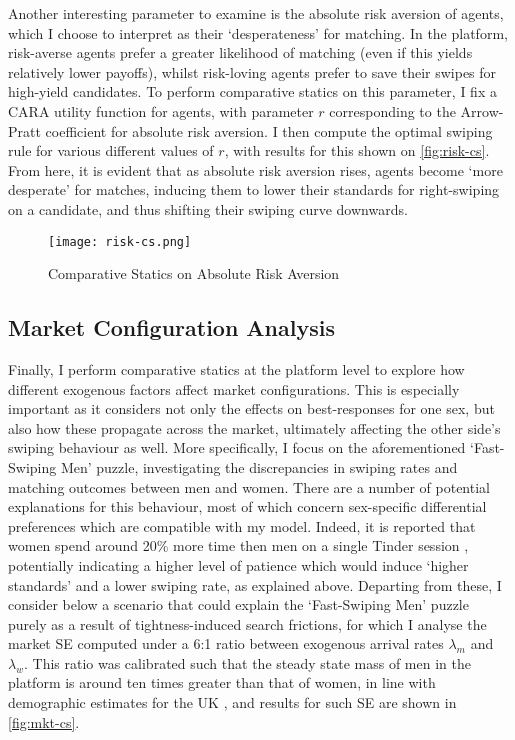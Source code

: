 Another interesting parameter to examine is the absolute risk aversion of agents, which I choose to interpret as their `desperateness' for matching.
In the platform, risk-averse agents prefer a greater likelihood of matching (even if this yields relatively lower payoffs), whilst risk-loving agents prefer to save their swipes for high-yield candidates. 
To perform comparative statics on this parameter, I fix a CARA utility function for agents, with parameter $r$ corresponding to the Arrow-Pratt coefficient for absolute risk aversion. 
I then compute the optimal swiping rule for various different values of $r$, with results for this shown on \autoref{fig:risk-cs}.
From here, it is evident that as absolute risk aversion rises, agents become `more desperate' for matches, inducing them to lower their standards for right-swiping on a candidate, and thus shifting their swiping curve downwards.

\begin{figure}[ht]
    \centering
    \caption{Comparative Statics on Absolute Risk Aversion}
    \texttt{[image: risk-cs.png]}
    \label{fig:risk-cs} 
\end{figure}

\subsection{Market Configuration Analysis}\label{sec:section3.3} 
Finally, I perform comparative statics at the platform level to explore how different exogenous factors affect market configurations. 
This is especially important as it considers not only the effects on best-responses for one sex, but also how these propagate across the market, ultimately affecting the other side's swiping behaviour as well. 
More specifically, I focus on the aforementioned `Fast-Swiping Men' puzzle, investigating the discrepancies in swiping rates and matching outcomes between men and women. 
There are a number of potential explanations for this behaviour, most of which concern sex-specific differential preferences which are compatible with my model. 
Indeed, it is reported that women spend around 20\% more time then men on a single Tinder session \citep{web:nytimes_patience}, potentially indicating a higher level of patience which would induce `higher standards' and a lower swiping rate, as explained above.
Departing from these, I consider below a scenario that could explain the `Fast-Swiping Men' puzzle purely as a result of tightness-induced search frictions, for which I analyse the market SE computed under a 6:1 ratio between exogenous arrival rates $\lambda_m$ and $\lambda_w$.  
This ratio was calibrated such that the steady state mass of men in the platform is around ten times greater than that of women, in line with demographic estimates for the UK \citep{web:tinder_stats}, and results for such SE are shown in \autoref{fig:mkt-cs}. 

